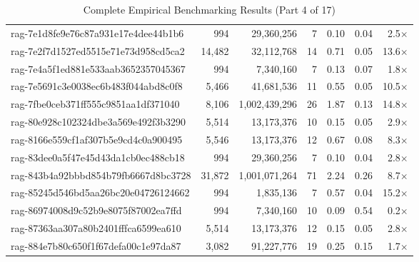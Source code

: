 \begin{table}[h!]
\begin{tabular}{lrrrrrr}
rag-7e1d8fe9e76c87a931e17e4dee44b1b6 & 994 & 29,360,256 & 7 & 0.10 & 0.04 & 2.5$\times$ \\
rag-7e2f7d1527ed5515e71e73d958cd5ca2 & 14,482 & 32,112,768 & 14 & 0.71 & 0.05 & 13.6$\times$ \\
rag-7e4a5f1ed881e533aab3652357045367 & 994 & 7,340,160 & 7 & 0.13 & 0.07 & 1.8$\times$ \\
rag-7e5691c3e0038ec6b483f044abd8c0f8 & 5,466 & 41,681,536 & 11 & 0.55 & 0.05 & 10.5$\times$ \\
rag-7fbe0ceb371ff555c9851aa1df371040 & 8,106 & 1,002,439,296 & 26 & 1.87 & 0.13 & 14.8$\times$ \\
rag-80e928c102324dbe3a569e492f3b3290 & 5,514 & 13,173,376 & 10 & 0.15 & 0.05 & 2.9$\times$ \\
rag-8166e559cf1af307b5e9cd4c0a900495 & 5,546 & 13,173,376 & 12 & 0.67 & 0.08 & 8.3$\times$ \\
rag-83dee0a5f47e45d43da1cb0ec488cb18 & 994 & 29,360,256 & 7 & 0.10 & 0.04 & 2.8$\times$ \\
rag-843b4a92bbbd854b79fb6667d8bc3728 & 31,872 & 1,001,071,264 & 71 & 2.24 & 0.26 & 8.7$\times$ \\
rag-85245d546bd5aa26bc20e04726124662 & 994 & 1,835,136 & 7 & 0.57 & 0.04 & 15.2$\times$ \\
rag-86974008d9c52b9e8075f87002ea7ffd & 994 & 7,340,160 & 10 & 0.09 & 0.54 & 0.2$\times$ \\
rag-87363aa307a80b2401fffca6599ea610 & 5,514 & 13,173,376 & 12 & 0.15 & 0.05 & 2.8$\times$ \\
rag-884e7b80c650f1f67defa00c1e97da87 & 3,082 & 91,227,776 & 19 & 0.25 & 0.15 & 1.7$\times$ \\
\bottomrule
\end{tabular}
\caption{Complete Empirical Benchmarking Results (Part 4 of 17)}
\end{table}

\clearpage

